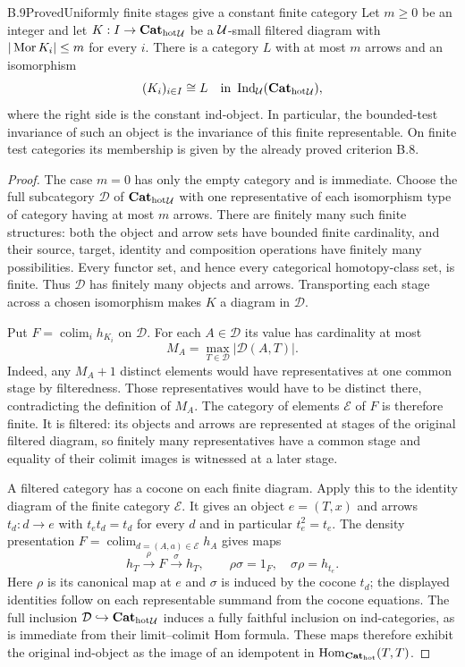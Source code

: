 \begin{claim}{B.9}{Proved}{Uniformly finite stages give a constant finite category}
Let $m\geq0$ be an integer and let $K:I\to{\mathbf{Cat}_{\mathrm{hot}}}_\mathcal U$ be
a $\mathcal U$-small filtered diagram with $|\operatorname{Mor} K_i|\leq m$ for
every $i$. There is a category $L$ with at most $m$ arrows and
an isomorphism
\[
                 (K_i)_{i\in I}\cong L
                   \quad\hbox{in }\operatorname{Ind}_\mathcal U({\mathbf{Cat}_{\mathrm{hot}}}_\mathcal U),
\]
where the right side is the constant ind-object. In particular,
the bounded-test invariance of such an object is the invariance
of this finite representable. On finite test categories its
membership is given by the already proved criterion B.8.
\end{claim}
\begin{proof}
The case $m=0$ has only the empty category and is immediate.
Choose the full subcategory $\mathcal D$ of ${\mathbf{Cat}_{\mathrm{hot}}}_\mathcal U$
with one representative of each isomorphism type of category
having at most $m$ arrows. There are finitely many such finite
structures: both the object and arrow sets have bounded finite
cardinality, and their source, target, identity and composition
operations have finitely many possibilities. Every functor set,
and hence every categorical homotopy-class set, is finite.
Thus $\mathcal D$ has finitely many objects and arrows.
Transporting each stage across a chosen isomorphism makes $K$
a diagram in $\mathcal D$.

Put $F=\operatorname{colim}_i h_{K_i}$ on $\mathcal D$.
For each $A\in\mathcal D$ its value has cardinality at most
\[
             M_A=\max_{T\in\mathcal D}|\mathcal D(A,T)|.
\]
Indeed, any $M_A+1$ distinct elements would have representatives
at one common stage by filteredness. Those representatives
would have to be distinct there, contradicting the definition
of $M_A$. The category of elements $\mathcal E$ of $F$ is
therefore finite. It is filtered: its objects and arrows are
represented at stages of the original filtered diagram, so
finitely many representatives have a common stage and equality
of their colimit images is witnessed at a later stage.

A filtered category has a cocone on each finite diagram. Apply
this to the identity diagram of the finite category $\mathcal E$.
It gives an object $e=(T,x)$ and arrows
$t_d:d\to e$ with $t_e t_d=t_d$ for every $d$ and in particular
$t_e^2=t_e$. The density presentation
$F=\operatorname{colim}_{d=(A,a)\in\mathcal E}h_A$ gives maps
\[
             h_T\xrightarrow{\rho}F
                       \xrightarrow{\sigma}h_T,
             \qquad \rho\sigma=1_F,
             \quad\sigma\rho=h_{t_e}.
\]
Here $\rho$ is its canonical map at $e$ and $\sigma$ is induced
by the cocone $t_d$; the displayed identities follow on each
representable summand from the cocone equations. The full
inclusion $\mathcal D\hookrightarrow{\mathbf{Cat}_{\mathrm{hot}}}_\mathcal U$ induces a
fully faithful inclusion on ind-categories, as is immediate from
their limit--colimit Hom formula. These maps therefore exhibit
the original ind-object as the image of an idempotent in
$\operatorname{Hom}_{{\mathbf{Cat}_{\mathrm{hot}}}}(T,T)$.


\end{proof}
